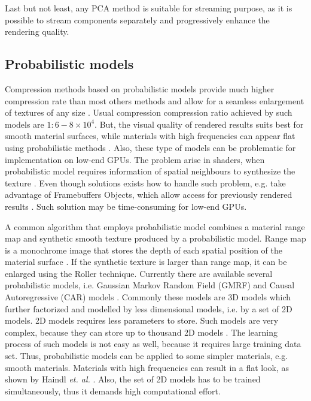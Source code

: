 Last but not least, any PCA method is suitable for streaming purpose, as it is possible to stream components separately and progressively enhance the rendering quality. 






 \subsection{Probabilistic models}
\label{section:prob_methods}

Compression methods based on probabilistic models \cite{car_model,gmrf_model,haindl}
 provide much higher compression rate than most others methods and allow for a seamless enlargement of textures of any size \cite{haindl}. 
Usual compression  compression ratio achieved by such models are $1:6-8\times 10^{4}$.
But, the visual quality of rendered results suits best for smooth material surfaces, while materials with high frequencies can appear flat using probabilistic methods \cite{haindl}.
Also, these type of models can be problematic for implementation on low-end GPUs. 
The problem arise in shaders, when probabilistic model requires information of spatial neighbours to synthesize the texture \cite{gmrf_model,haindl}.
Even though solutions exists  how to handle such problem, e.g. take advantage of Framebuffers Objects, which allow access for previously rendered results \cite{haindl}.
Such solution may be time-consuming for low-end GPUs.

A common algorithm that employs probabilistic model combines a material range map and synthetic smooth texture produced by a probabilistic model.
Range map is a monochrome image that stores the depth of each spatial position of the material surface \cite{gmrf_model}.
If the synthetic texture is larger than range map, it can be enlarged using the Roller technique\cite{btfroller}.
Currently there are available several probabilistic models, i.e. Gaussian Markov Random Field (GMRF) and  Causal Autoregressive (CAR) models \cite{haindl,Bishop}.
Commonly these models are 3D models which further factorized and modelled by less dimensional models, i.e. by a set of 2D models.
2D models requires less parameters to store. Such models are very complex, because they can store up to thousand 2D models \cite{haindl_visual}.
The learning process of such models is not easy as well, because it requires large training data set. 
Thus, probabilistic models can be applied to some simpler materials, e.g. smooth materials. 
Materials with high frequencies can result in a flat look, as shown by Haindl  \emph{et. al.} \cite{haindl}.
Also, the set of 2D models has to be trained simultaneously, thus it demands high computational effort.



